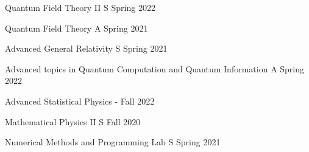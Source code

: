 
\begin{multicols}{2}

\setlength{\parskip}{0\baselineskip}%


\begin{cvcourseworks}

  \cvcoursework
    {Quantum Field Theory II} %
    {} %
    {S} %
    {Spring 2022} %

  \cvcoursework
    {Quantum Field Theory} %
    {} %
    {A} %
    {Spring 2021} %

  \cvcoursework
    {Advanced General Relativity} %
    {} %
    {S} %
    {Spring 2021} %

  \cvcoursework
    {Advanced topics in Quantum Computation and Quantum Information} %
    {} %
    {A} %
    {Spring 2022} %

  \cvcoursework
    {Advanced Statistical Physics} %
    {} %
    {-} %
    {Fall 2022} %

  \cvcoursework
    {Mathematical Physics II} %
    {} %
    {S} %
    {Fall 2020} %

  \cvcoursework
    {Numerical Methods and Programming Lab} %
    {} %
    {S} %
    {Spring 2021} %

\end{cvcourseworks}


\end{multicols}
